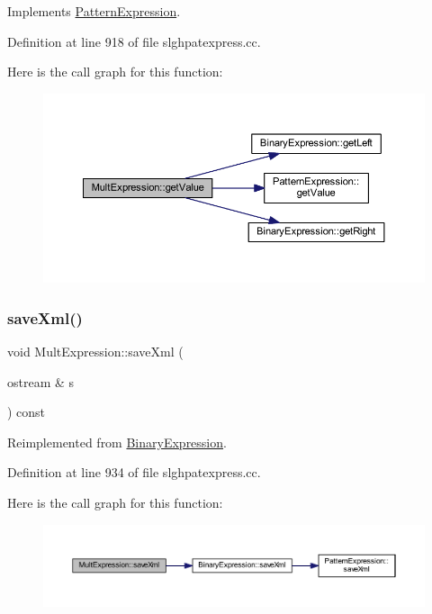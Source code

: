 Implements \mbox{\hyperlink{class_pattern_expression_a8332c6ea4c5a7e9dfc690df2a6458bb8}{Pattern\+Expression}}.



Definition at line 918 of file slghpatexpress.\+cc.

Here is the call graph for this function\+:
\nopagebreak
\begin{figure}[H]
\begin{center}
\leavevmode
\includegraphics[width=350pt]{class_mult_expression_a82c37f1e8c8b88955946f416619a861e_cgraph}
\end{center}
\end{figure}
\mbox{\label{class_mult_expression_a98a416d51ae41bf94a6e211e310e6d53}} 
\subsubsection{\texorpdfstring{saveXml()}{saveXml()}}
{\footnotesize\ttfamily void Mult\+Expression\+::save\+Xml (\begin{DoxyParamCaption}\item[{ostream \&}]{s }\end{DoxyParamCaption}) const\hspace{0.3cm}{\ttfamily [virtual]}}



Reimplemented from \mbox{\hyperlink{class_binary_expression_a4b9e768a619b713d6c1ff35a618d98ec}{Binary\+Expression}}.



Definition at line 934 of file slghpatexpress.\+cc.

Here is the call graph for this function\+:
\nopagebreak
\begin{figure}[H]
\begin{center}
\leavevmode
\includegraphics[width=350pt]{class_mult_expression_a98a416d51ae41bf94a6e211e310e6d53_cgraph}
\end{center}
\end{figure}


